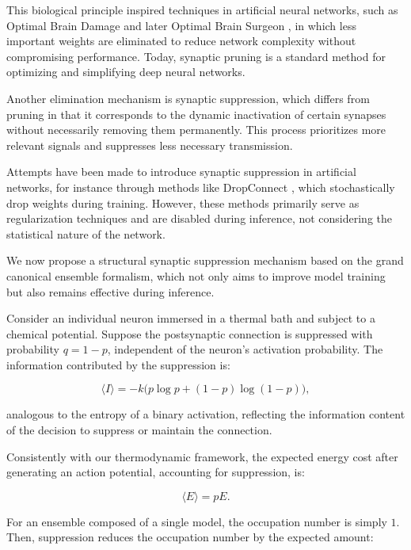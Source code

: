 \documentclass[12pt]{article}
\begin{document}
This biological principle inspired techniques in artificial neural networks, such as Optimal Brain Damage \cite{lecun1989optimal} and later Optimal Brain Surgeon \cite{hassibi1993second}, in which less important weights are eliminated to reduce network complexity without compromising performance. Today, synaptic pruning is a standard method for optimizing and simplifying deep neural networks.

Another elimination mechanism is synaptic suppression, which differs from pruning in that it corresponds to the dynamic inactivation of certain synapses without necessarily removing them permanently. This process prioritizes more relevant signals and suppresses less necessary transmission.

Attempts have been made to introduce synaptic suppression in artificial networks, for instance through methods like DropConnect \cite{wan2013regularization}, which stochastically drop weights during training. However, these methods primarily serve as regularization techniques and are disabled during inference, not considering the statistical nature of the network.

We now propose a structural synaptic suppression mechanism based on the grand canonical ensemble formalism, which not only aims to improve model training but also remains effective during inference.

Consider an individual neuron immersed in a thermal bath and subject to a chemical potential. Suppose the postsynaptic connection is suppressed with probability $q = 1-p$, independent of the neuron’s activation probability. The information contributed by the suppression is:

\begin{equation}
\langle I \rangle = -k \big( p \log p + (1-p) \log(1-p) \big),
\end{equation}

analogous to the entropy of a binary activation, reflecting the information content of the decision to suppress or maintain the connection.

Consistently with our thermodynamic framework, the expected energy cost after generating an action potential, accounting for suppression, is:

\begin{equation}
\langle E \rangle = p E.
\end{equation}

For an ensemble composed of a single model, the occupation number is simply $1$. Then, suppression reduces the occupation number by the expected amount:
\end{document}
